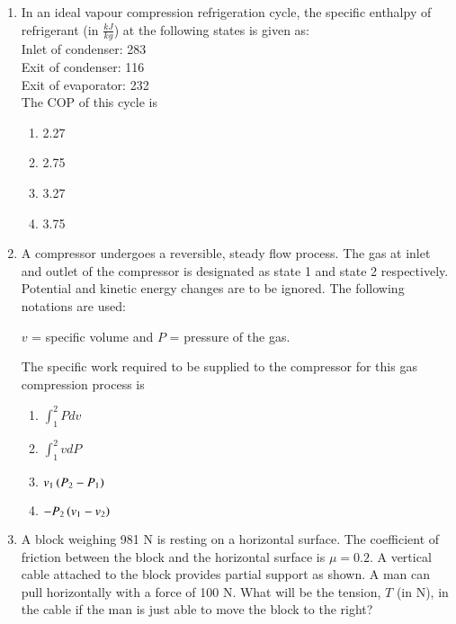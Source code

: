 \documentclass[journal]{IEEEtran}
\begin{document}
\begin{enumerate}
    \item In an ideal vapour compression refrigeration cycle, the specific
    enthalpy of refrigerant (in $\frac{kJ}{kg}$) at the following states is given as: \\
    Inlet of condenser: 283 \\
    Exit of condenser: 116 \\
    Exit of evaporator: 232 \\
    The COP of this cycle is
    \begin{multicols}{4}
    \begin{enumerate}
        \item 2.27
        \item 2.75
        \item 3.27
        \item 3.75
    \end{enumerate}
    \end{multicols}

    \item A compressor undergoes a reversible, steady flow process. The gas
    at inlet and outlet of the compressor is designated as state 1 and state
    2 respectively. Potential and kinetic energy changes are to be ignored.
    The following notations are used:
    
    $v$ = specific volume and $P$ = pressure of the gas.
    
    The specific work required to be supplied to the compressor for this gas
    compression process is 
    \begin{multicols}{4}
    \begin{enumerate}
    \item $\int_{1}^{2} Pdv$
    \item $\int_{1}^{2} vdP$
    \item $v_1\left(P_2 - P_1\right)$
    \item $-P_2\left(v_1 - v_2\right)$
    \end{enumerate}
    \end{multicols}

    \item A block weighing 981 N is resting on a horizontal surface. The coefficient
    of friction between the block and the horizontal surface is $\mu = 0.2$. A vertical
    cable attached to the block provides partial support as shown. A man can pull
    horizontally with a force of 100 N. What will be the tension, $T$ (in N), in the
    cable if the man is just able to move the block to the right?
    

\end{enumerate}
\end{document}
